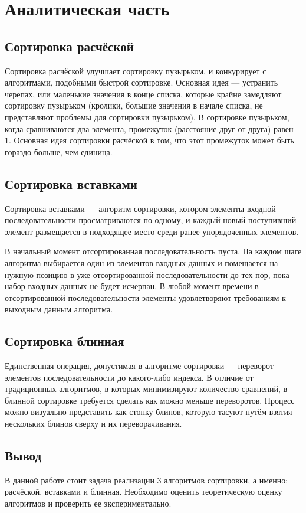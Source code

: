 \chapter{Аналитическая часть}

\section{Сортировка расчёской}
Сортировка расчёской улучшает сортировку пузырьком, и конкурирует с алгоритмами, подобными быстрой сортировке.
Основная идея — устранить черепах, или маленькие значения в конце списка, которые крайне замедляют сортировку пузырьком (кролики, большие значения в начале списка, не представляют проблемы для сортировки пузырьком).
В сортировке пузырьком, когда сравниваются два элемента, промежуток (расстояние друг от друга) равен 1.
Основная идея сортировки расчёской в том, что этот промежуток может быть гораздо больше, чем единица.

\section{Сортировка вставками}
Сортировка вставками — алгоритм сортировки, котором элементы входной последовательности просматриваются по одному, и каждый новый поступивший элемент размещается в подходящее место среди ранее упорядоченных элементов.

В начальный момент отсортированная последовательность пуста.
На каждом шаге алгоритма выбирается один из элементов входных данных и помещается на нужную позицию в уже отсортированной последовательности до тех пор, пока набор входных данных не будет исчерпан.
В любой момент времени в отсортированной последовательности элементы удовлетворяют требованиям к выходным данным алгоритма.

\section{Сортировка блинная}
Единственная операция, допустимая в алгоритме сортировки — переворот элементов последовательности до какого-либо индекса.
В отличие от традиционных алгоритмов, в которых минимизируют количество сравнений, в блинной сортировке требуется сделать как можно меньше переворотов.
Процесс можно визуально представить как стопку блинов, которую тасуют путём взятия нескольких блинов сверху и их переворачивания.

\section*{Вывод}
В данной работе стоит задача реализации 3 алгоритмов сортировки, а именно: расчёской, вставками и блинная.
Необходимо оценить теоретическую оценку алгоритмов и проверить ее экспериментально.
